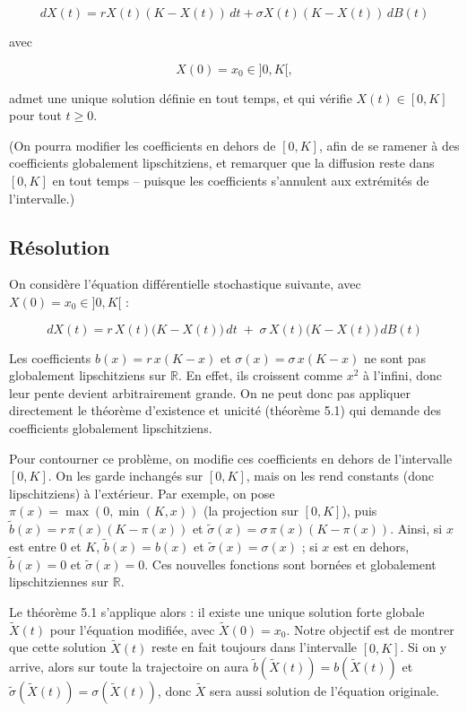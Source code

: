 \documentclass[12pt,a4paper]{article}
\theoremstyle{remark}
\begin{document}
\[
dX(t) = rX(t)(K - X(t))\,dt + \sigma X(t)(K - X(t))\,dB(t)
\]

avec

\[
X(0) = x_0 \in ]0, K[,
\]

admet une unique solution définie en tout temps, et qui vérifie \(X(t) \in [0, K]\) pour tout \(t \geq 0\).

(On pourra modifier les coefficients en dehors de \([0, K]\), afin de se ramener à des coefficients globalement lipschitziens, et remarquer que la diffusion reste dans \([0, K]\) en tout temps – puisque les coefficients s'annulent aux extrémités de l'intervalle.)

\subsection*{Résolution}

On considère l'équation différentielle stochastique suivante, avec \(X(0)=x_0\in]0,K[\) :

\[
dX(t) = r\,X(t)\bigl(K-X(t)\bigr)\,dt \;+\; \sigma\,X(t)\bigl(K-X(t)\bigr)\,dB(t)
\]

Les coefficients \(b(x)=r\,x(K-x)\) et \(\sigma(x)=\sigma\,x(K-x)\) ne sont pas globalement lipschitziens sur \(\mathbb{R}\). En effet, ils croissent comme \(x^2\) à l'infini, donc leur pente devient arbitrairement grande. On ne peut donc pas appliquer directement le théorème d'existence et unicité (théorème 5.1) qui demande des coefficients globalement lipschitziens.

Pour contourner ce problème, on modifie ces coefficients en dehors de l'intervalle \([0,K]\). On les garde inchangés sur \([0,K]\), mais on les rend constants (donc lipschitziens) à l'extérieur. Par exemple, on pose \(\pi(x)=\max(0,\min(K,x))\) (la projection sur \([0,K]\)), puis \(\tilde b(x)=r\,\pi(x)(K-\pi(x))\) et \(\tilde\sigma(x)=\sigma\,\pi(x)(K-\pi(x))\). Ainsi, si \(x\) est entre \(0\) et \(K\), \(\tilde b(x)=b(x)\) et \(\tilde\sigma(x)=\sigma(x)\) ; si \(x\) est en dehors, \(\tilde b(x)=0\) et \(\tilde\sigma(x)=0\). Ces nouvelles fonctions sont bornées et globalement lipschitziennes sur \(\mathbb{R}\).

Le théorème 5.1 s'applique alors : il existe une unique solution forte globale \(\tilde X(t)\) pour l'équation modifiée, avec \(\tilde X(0)=x_0\). Notre objectif est de montrer que cette solution \(\tilde X(t)\) reste en fait toujours dans l'intervalle \([0,K]\). Si on y arrive, alors sur toute la trajectoire on aura \(\tilde b(\tilde X(t)) = b(\tilde X(t))\) et \(\tilde\sigma(\tilde X(t)) = \sigma(\tilde X(t))\), donc \(\tilde X\) sera aussi solution de l'équation originale.
\end{document}
